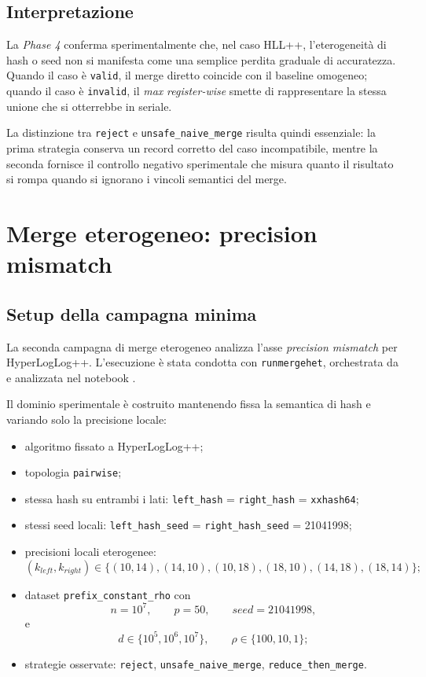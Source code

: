 \subsection{Interpretazione}

La \emph{Phase 4} conferma sperimentalmente che, nel caso HLL++, l'eterogeneità
di hash o seed non si manifesta come una semplice perdita graduale di
accuratezza. Quando il caso è \texttt{valid}, il merge diretto coincide con il
baseline omogeneo; quando il caso è \texttt{invalid}, il \emph{max}
\emph{register-wise} smette di rappresentare la stessa unione che si
otterrebbe in seriale.

La distinzione tra \texttt{reject} e \texttt{unsafe\_naive\_merge} risulta
quindi essenziale: la prima strategia conserva un record corretto del caso
incompatibile, mentre la seconda fornisce il controllo negativo sperimentale
che misura quanto il risultato si rompa quando si ignorano i vincoli semantici
del merge.

\section{Merge eterogeneo: precision mismatch}

\subsection{Setup della campagna minima}

La seconda campagna di merge eterogeneo analizza l'asse
\emph{precision mismatch} per HyperLogLog++. L'esecuzione è stata condotta con
\texttt{runmergehet}, orchestrata da
 e analizzata nel notebook
.

Il dominio sperimentale è costruito mantenendo fissa la semantica di hash e
variando solo la precisione locale:
\begin{itemize}
    \item algoritmo fissato a HyperLogLog++;
    \item topologia \texttt{pairwise};
    \item stessa hash su entrambi i lati:
    \texttt{left\_hash} = \texttt{right\_hash} = \texttt{xxhash64};
    \item stessi seed locali:
    \texttt{left\_hash\_seed} = \texttt{right\_hash\_seed} = 21041998;
    \item precisioni locali eterogenee:
    \[
    (k_{left},k_{right}) \in
    \{(10,14),(14,10),(10,18),(18,10),(14,18),(18,14)\};
    \]
    \item dataset \texttt{prefix\_constant\_rho} con
    \[
    n = 10^7,\qquad p = 50,\qquad seed = 21041998,
    \]
    e
    \[
    d \in \{10^5,10^6,10^7\},\qquad \rho \in \{100,10,1\};
    \]
    \item strategie osservate:
    \texttt{reject}, \texttt{unsafe\_naive\_merge},
    \texttt{reduce\_then\_merge}.
\end{itemize}

